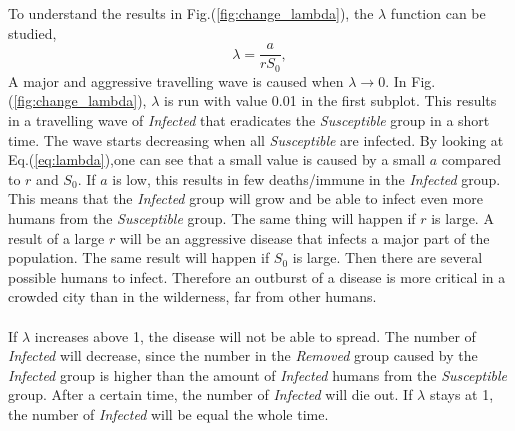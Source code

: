 \documentclass[%
twoside,                 %
final,                   %
chapterprefix=true,      %
open=right               %
10pt]{book}
\begin{document}
\\
\\
To understand the results in Fig.(\ref{fig:change_lambda}), the $\lambda $ function can be studied,
\begin{equation} \label{eq:lambda}
 \lambda =\frac{a}{rS_0},
\end{equation}
A major and aggressive travelling wave is caused when $\lambda \rightarrow 0$. In Fig.(\ref{fig:change_lambda}), $\lambda$ is run with value 0.01 in the first subplot. This results in a travelling wave of \emph{Infected} that eradicates the \emph{Susceptible} group in a short time. The wave starts decreasing when all \emph{Susceptible} are infected. By looking at Eq.(\ref{eq:lambda}),one can see that a small value is caused by a small $a$ compared to $r$ and $S_0$. If $a$ is low, this results in few deaths/immune in the \emph{Infected} group. This means that the \emph{Infected} group will grow and be able to infect even more humans from the \emph{Susceptible} group. The same thing will happen if $r$ is large. A result of a large $r$ will be an aggressive disease that infects  a major part of the population. The same result will happen if $S_0$ is large. Then there are several possible humans to infect. Therefore an outburst of a disease is more critical in a crowded city than in the wilderness, far from other humans.
\\
\\
If $\lambda$ increases above 1, the disease will not be able to spread. The number of \emph{Infected} will decrease, since the number in the \emph{Removed} group caused by the \emph{Infected} group is higher than the amount of \emph{Infected} humans from the \emph{Susceptible} group. After a certain time, the number of \emph{Infected} will die out. If $\lambda$ stays at 1, the number of \emph{Infected} will be equal the whole time. 
\end{document}
